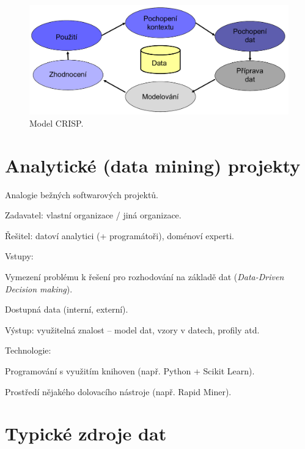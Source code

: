 \begin{figure}[H]
    \centering
    \includegraphics[width=0.75\linewidth]{crisp.pdf}
    \caption{Model CRISP.}
\end{figure}


\section{Analytické (data mining) projekty}

\begin{compactitem}
    \item Analogie bežných softwarových projektů.
    \item Zadavatel: vlastní organizace / jiná organizace.
    \item Řešitel: datoví analytici (+ programátoři), doménoví experti.
    \item Vstupy: \begin{compactitem}
        \item Vymezení problému k řešení pro rozhodování na základě dat (\textit{Data-Driven Decision making}).
        \item Dostupná data (interní, externí).
    \end{compactitem}
    \item Výstup: využitelná znalost -- model dat, vzory v datech, profily atd.
    \item Technologie: \begin{compactitem}
        \item Programování s využitím knihoven (např. Python + Scikit Learn).
        \item Prostředí nějakého dolovacího nástroje (např. Rapid Miner).
    \end{compactitem}
\end{compactitem}


\section{Typické zdroje dat}

